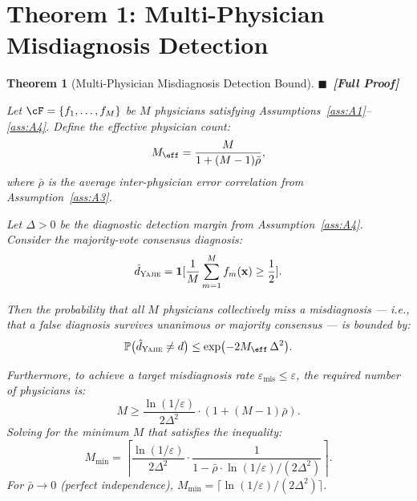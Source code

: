 \documentclass[11pt,a4paper]{article}
\newtheorem{theorem}{Theorem}[section]
\theoremstyle{definition}
\newcommand{\rigorFull}[0]{$\blacksquare$~\textbf{[Full Proof]}}
\newcommand{\Yajie}{\textsc{Yajie}}
\newcommand{\Pbb}{\mathbb{P}}
\newcommand{\ind}[1]{\mathbf{1}[#1]}
\newcommand{\disease}{d}                       %
\newcommand{\diagnosis}{\hat{d}}               %
\newcommand{\misdiagnosis}{\varepsilon_{\text{mis}}}  %
\begin{document}
\section{Theorem 1: Multi-Physician Misdiagnosis Detection}
\label{sec:thm1}

\begin{theorem}[Multi-Physician Misdiagnosis Detection Bound]
\label{thm:misdiagnosis_detection}
\rigorFull

Let $\cF = \{f_1, \dots, f_M\}$ be $M$ physicians satisfying
Assumptions~\ref{ass:A1}--\ref{ass:A4}.
Define the effective physician count:
\begin{equation}\label{eq:Meff_med}
    M_{\eff} = \frac{M}{1 + (M-1)\bar{\rho}},
\end{equation}
where $\bar{\rho}$ is the average inter-physician error correlation from
Assumption~\ref{ass:A3}.

Let $\Delta > 0$ be the diagnostic detection margin from Assumption~\ref{ass:A4}.
Consider the majority-vote consensus diagnosis:
\begin{equation}\label{eq:consensus_diag}
    \diagnosis_{\Yajie} = \ind{\frac{1}{M}\sum_{m=1}^{M} f_m(\mathbf{x}) \ge \frac{1}{2}}.
\end{equation}

Then the probability that all $M$ physicians collectively miss a misdiagnosis
--- i.e., that a false diagnosis survives unanimous or majority consensus ---
is bounded by:
\begin{equation}\label{eq:thm1_main}
    \Pbb\bigl(\diagnosis_{\Yajie} \neq \disease\bigr)
    \le \exp\bigl(-2 M_{\eff} \, \Delta^2\bigr).
\end{equation}

Furthermore, to achieve a target misdiagnosis rate $\misdiagnosis \le \varepsilon$,
the required number of physicians is:
\begin{equation}\label{eq:M_required_med}
    M \ge \frac{\ln(1/\varepsilon)}{2\Delta^2} \cdot (1 + (M-1)\bar{\rho}).
\end{equation}
Solving for the minimum $M$ that satisfies the inequality:
\begin{equation}\label{eq:M_min_med}
    M_{\min} = \left\lceil \frac{\ln(1/\varepsilon)}{2\Delta^2} \cdot \frac{1}{1 - \bar{\rho} \cdot \ln(1/\varepsilon)/(2\Delta^2)} \right\rceil.
\end{equation}
For $\bar{\rho} \to 0$ (perfect independence), $M_{\min} = \lceil \ln(1/\varepsilon)/(2\Delta^2) \rceil$.
\end{theorem}
\end{document}
